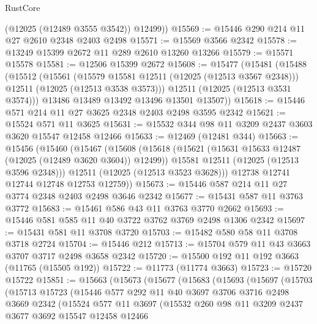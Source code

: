 \begin{lexlean}{RustCore}
\begin{coremodule}
        (@12025 (@12489 @3555 @3542))
        @12499))
@15569 := @15446 @290 @214 @11 @27 @2610 @2348 @2403 @2498
@15571 := @15569 @3566 @2342
@15578 := @13249 @15399 @2672 @11 @289 @2610 @13260 @13266
@15579 := @15571 @15578
@15581 := @12506 @15399 @2672
@15608 := @15477
    (@15481
      (@15488
        (@15512
          (@15561
            (@15579 @15581 @12511 (@12025 (@12513 @3567 @2348)))
            @12511
            (@12025 (@12513 @3538 @3573)))
          @12511
          (@12025 (@12513 @3531 @3574)))
        @13486
        @13489
        @13492
        @13496
        @13501
        @13507))
@15618 := @15446 @571 @214 @11 @27 @3625 @2348 @2403 @2498 @3595 @2342
@15621 := @15524 @571 @11 @3625
@15631 := @15532 @344 @98 @11 @3209 @2437 @3603 @3620 @15547 @12458 @12466
@15633 := @12469 (@12481 @344)
@15663 := @15456
    (@15460
      (@15467
        (@15608
          (@15618
            (@15621 (@15631 @15633 @12487 (@12025 (@12489 @3620 @3604)) @12499))
            @15581
            @12511
            (@12025 (@12513 @3596 @2348)))
          @12511
          (@12025 (@12513 @3523 @3628)))
        @12738
        @12741
        @12744
        @12748
        @12753
        @12759))
@15673 := @15446 @587 @214 @11 @27 @3774 @2348 @2403 @2498 @3646 @2342
@15677 := @15431 @587 @11 @3763 @3772
@15683 := @15461 @586 @43 @11 @3763 @3770 @2662
@15693 := @15446 @581 @585 @11 @40 @3722 @3762 @3769 @2498 @1306 @2342
@15697 := @15431 @581 @11 @3708 @3720
@15703 := @15482 @580 @58 @11 @3708 @3718 @2724
@15704 := @15446 @212
@15713 := @15704 @579 @11 @43 @3663 @3707 @3717 @2498 @3658 @2342
@15720 := @15500 @192 @11 @192 @3663 (@11765 (@15505 @192))
@15722 := @11773 (@11774 @3663)
@15723 := @15720 @15722
@15851 := @15663
    (@15673
      (@15677
        (@15683
          (@15693
            (@15697
              (@15703
                (@15713
                  @15723
                  (@15446
                    @577
                    @292
                    @11
                    @40
                    @3697
                    @3706
                    @3716
                    @2498
                    @3669
                    @2342
                    (@15524
                      @577
                      @11
                      @3697
                      (@15532
                        @260
                        @98
                        @11
                        @3209
                        @2437
                        @3677
                        @3692
                        @15547
                        @12458
                        @12466

\end{coremodule}
\end{lexlean}
